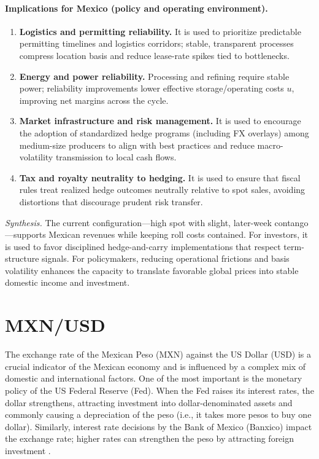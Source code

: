 \documentclass[10pt,a4paper]{article} %
\let\oldsection\section
\renewcommand{\section}{%
      \clearpage
      \thispagestyle{myfancy}%
      \oldsection
    }
\begin{document}
\paragraph{Implications for Mexico (policy and operating environment).}
\begin{enumerate}
  \item \textbf{Logistics and permitting reliability.} It is used to prioritize predictable permitting timelines and logistics corridors; stable, transparent processes compress location basis and reduce lease-rate spikes tied to bottlenecks.
  \item \textbf{Energy and power reliability.} Processing and refining require stable power; reliability improvements lower effective storage/operating costs \(u\), improving net margins across the cycle.
  \item \textbf{Market infrastructure and risk management.} It is used to encourage the adoption of standardized hedge programs (including FX overlays) among medium-size producers to align with best practices and reduce macro-volatility transmission to local cash flows.
  \item \textbf{Tax and royalty neutrality to hedging.} It is used to ensure that fiscal rules treat realized hedge outcomes neutrally relative to spot sales, avoiding distortions that discourage prudent risk transfer.
\end{enumerate}

\medskip
\noindent\emph{Synthesis.} The current configuration—high spot with slight, later-week contango—supports Mexican revenues while keeping roll costs contained. For investors, it is used to favor disciplined hedge-and-carry implementations that respect term-structure signals. For policymakers, reducing operational frictions and basis volatility enhances the capacity to translate favorable global prices into stable domestic income and investment.








\section{MXN/USD}
The exchange rate of the Mexican Peso (MXN) against the US Dollar (USD) is a crucial indicator of the Mexican economy and is influenced by a complex mix of domestic and international factors. One of the most important is the monetary policy of the US Federal Reserve (Fed). When the Fed raises its interest rates, the dollar strengthens, attracting investment into dollar-denominated assets and commonly causing a depreciation of the peso (i.e., it takes more pesos to buy one dollar). Similarly, interest rate decisions by the Bank of Mexico (Banxico) impact the exchange rate; higher rates can strengthen the peso by attracting foreign investment \citep{dallasfed_peso_2023,banxico_regional_2024}.
\end{document}
